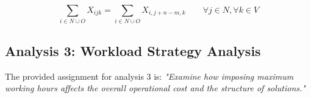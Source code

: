 \begin{equation} 
\sum_{i\in N \cup O} X_{ijk} = \sum_{i\in N \cup O} X_{i,j+n-m,k}          \qquad   \forall j\in N, \forall k \in V
\label{F m5 pick-up, delivery}
\end{equation}


\vspace{0.5cm}
\subsection{Analysis 3: Workload Strategy Analysis}
The provided assignment for analysis 3 is: \textit{"Examine how imposing maximum working hours affects the overall operational cost and the structure of solutions."}

\newpage


